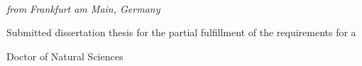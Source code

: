 \cleardoublepage%
{\setlength{\parindent}{0cm}
	\begin{fullwidth}%
		~\fontsize{36}{40}\selectfont\par{}%
		\vspace{2pc}%
		\fontsize{24}{28}\selectfont\par{}%
		\vspace{10pc}%
		\fontsize{18}{20}\selectfont\par{\allcaps{\thanklessauthor}}%
		\vspace{.5ex}
		\fontsize{18}{20}\selectfont\par{\textit{from Frankfurt am Main, Germany}}%
		\vfill%
		\fontsize{14}{16}\selectfont\par
		Submitted dissertation thesis for the partial fulfillment of the requirements for a\par
		Doctor of Natural Sciences\par
		\vspace{2pc}
		\thedate\par
		\vspace{4pc}
	\end{fullwidth}%
}
\thispagestyle{empty}%
\clearpage%